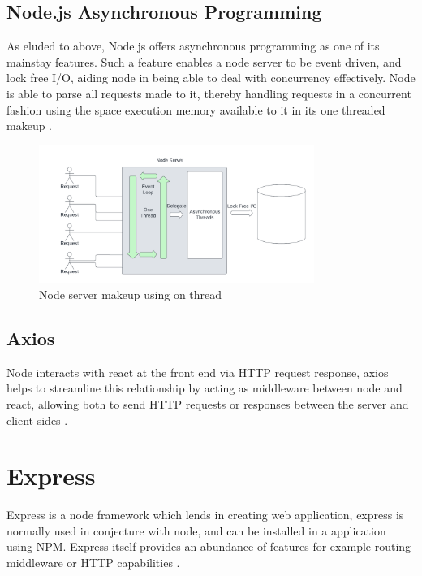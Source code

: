 \subsection{Node.js Asynchronous Programming}
As eluded to above, Node.js offers asynchronous programming as one of its mainstay features. Such a feature enables a node server to be event driven, and lock free I/O, aiding node in being able to deal with concurrency effectively. Node is able to parse all requests made to it, thereby handling requests in a concurrent fashion using the space execution memory available to it in its one threaded makeup \cite{chhetri2016comparative}.
\begin{figure}[h!]
    \centering
    \includegraphics[width=0.8\textwidth]{images/SingleThread.png}
    \caption{Node server makeup using on thread}
    \label{image:SingleThread}
\end{figure}

\subsection{Axios}
Node interacts with react at the front end via HTTP request response, axios helps to streamline this relationship by acting as middleware between node and react, allowing both to send HTTP requests or responses between the server and client sides \cite{saundariya2021webapp}\cite{rawat2020reactjs}.

\section{Express}
Express is a node framework which lends in creating web application, express is normally used in conjecture with node, and can be installed in a application using NPM. Express itself provides an abundance of features for example routing middleware or HTTP capabilities \cite{mardan2018using}.

